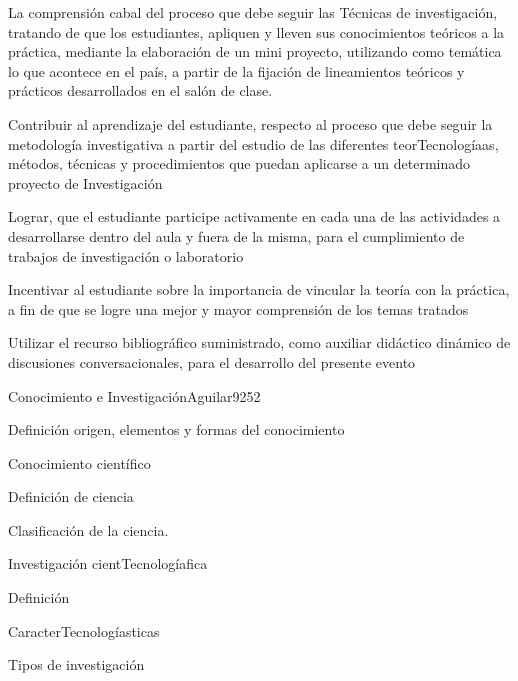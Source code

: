 \begin{syllabus}


\begin{justification}
La comprensión cabal del proceso que debe seguir las Técnicas de
investigación,  tratando de que los estudiantes, apliquen y lleven 
sus conocimientos teóricos a la  práctica, mediante la elaboración 
de un mini proyecto,  utilizando como temática  lo que acontece en 
el país,  a partir de la fijación de lineamientos  teóricos y 
prácticos desarrollados en el salón de clase.
\end{justification}

\begin{goals}
\item Contribuir al aprendizaje del estudiante, respecto al proceso que debe seguir la metodología investigativa a partir del estudio de las diferentes teorTecnologíaas, métodos, técnicas y procedimientos que puedan aplicarse a un determinado proyecto de Investigación 
\item Lograr, que el estudiante participe activamente  en cada una de las actividades a desarrollarse dentro del aula  y fuera de la misma, para el cumplimiento de trabajos de investigación o laboratorio
\item Incentivar al estudiante sobre la  importancia de vincular la teoría con la práctica, a fin de que se logre una mejor y mayor comprensión de los temas tratados
\item Utilizar el recurso bibliográfico suministrado, como auxiliar didáctico dinámico de discusiones conversacionales,  para el desarrollo del presente evento
\end{goals}

\begin{outcomes}
\end{outcomes}

\begin{unit}{Conocimiento e Investigación}{Aguilar92}{5}{2}
   \begin{topics}
      \item Definición origen, elementos y formas del conocimiento
	\item Conocimiento científico
	\item Definición de ciencia
	\item Clasificación de la ciencia.
	\item Investigación cientTecnologíafica
	\item Definición
	\item CaracterTecnologíasticas
	\item Tipos de investigación
   \end{topics}


\end{unit}
\end{syllabus}
